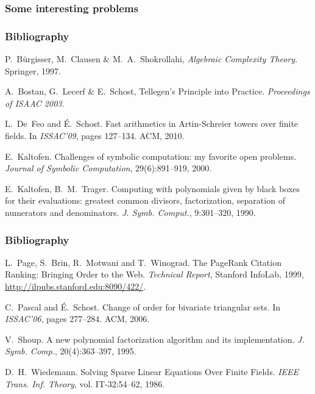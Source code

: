 \documentclass[10pt]{beamer}
\begin{document}

\begin{frame}
  \frametitle{Some interesting problems}

\end{frame}


\begin{frame}
  \frametitle{Bibliography}

  \begin{thebibliography}{1}
  
  P.~Bürgisser, M.~Clausen \& M.~A.~Shokrollahi,
    \newblock \emph{Algebraic Complexity Theory}.
    \newblock Springer, 1997.
    
  A.~Bostan, G.~Lecerf \& E.~Schost,
    \newblock Tellegen's Principle into Practice.
    \newblock \emph{Proceedings of ISAAC 2003}.

    L.~De~Feo and {\'E}.~Schost.
    \newblock Fast arithmetics in Artin-Schreier towers over finite fields. 
    \newblock In \emph{ISSAC'09}, pages 127--134. ACM, 2010.

    E.~Kaltofen.
    \newblock Challenges of symbolic computation: my
    favorite open problems.
    \newblock \emph{Journal of Symbolic Computation}, 29(6):891--919, 2000.

    E.~Kaltofen, B.~M.~Trager.
    \newblock Computing with polynomials given by black boxes for their
    evaluations: greatest common divisors, factorization, separation of 
    numerators and denominators.
    \newblock \emph{J. Symb. Comput.}, 9:301--320, 1990.

  \end{thebibliography}
\end{frame}

\begin{frame}
  \frametitle{Bibliography}

  \begin{thebibliography}{1}
  
    L.~Page, S.~Brin, R.~Motwani and T.~Winograd.
    \newblock The PageRank Citation Ranking: Bringing Order to the Web.
    \newblock \emph{Technical Report}, Stanford InfoLab, 1999,
    \url{http://ilpubs.stanford.edu:8090/422/}.

    C.~Pascal and \'E.~Schost.
    \newblock Change of order for bivariate triangular sets.
    \newblock In \emph{ISSAC'06}, pages 277--284. ACM, 2006.
    
    V.~Shoup.
    \newblock A new polynomial factorization algorithm and its implementation.
    \newblock \emph{J. Symb. Comp.}, 20(4):363--397, 1995.
    
    D.~H.~Wiedemann.
    \newblock Solving Sparse Linear Equations Over Finite Fields.
    \newblock \emph{IEEE Trans. Inf. Theory}, vol. IT-32:54--62, 1986.

  \end{thebibliography}
\end{frame}
\end{document}
